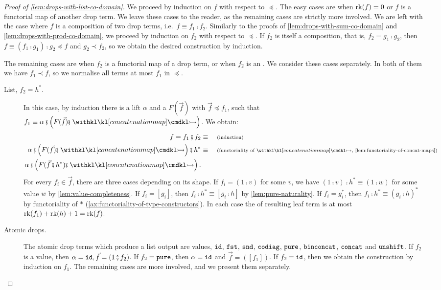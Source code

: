 \begin{proof}[Proof of \cref{lem:drops-with-list-co-domain}]
	We proceed by induction on $f$ with respect to $\preceq$. The easy cases are when $\mathrm{rk}(f) = 0$ or $f$ is a functorial map of another drop term. We leave these cases to the reader, as the remaining cases are strictly more involved. We are left with the case where $f$ is a composition of two drop terms, i.e.~$f \equiv f_1 \comp f_2$. Similarly to the proofs of \cref{lem:drops-with-sum-co-domain} and \cref{lem:drops-with-prod-co-domain}, we proceed by induction on $f_2$ with respect to $\preceq$. If $f_2$ is itself a composition, that is, $f_2 = g_1 \comp g_2$, then $f \equiv (f_1 \comp g_1) \comp g_2 \preceq f$ and $g_2 \prec f_2$, so we obtain the desired construction by induction. 

	The remaining cases are when $f_2$ is a functorial map of a drop term, or when $f_2$ is an . We consider these cases separately. In both of them we have $f_1 \prec f$, so we normalise all terms at most $f_1$ in $\preceq$.
	
	\begin{description}
		\item[List, $f_2 = h^*$.] In this case, by induction there is a lift $\alpha$ and a  $F(\vec f)$ with $\vec f \preceq f_1$, such that $f_1 \equiv \alpha \comp \left( F(\vec f) \comp \concmap \right)$. We obtain:
		\begin{align*}
			f = f_1 \comp f_2 \equalbecause{induction} \\ 
			\alpha \comp \left( F(\vec f) \comp \concmap \right) \comp h^* \equalbecause{functoriality of $\concmap$, \cref{lem:functoriality-of-concat-maps}} \\
			\alpha \comp \left( F(\vec f \comp h^*) \comp \concmap \right).
		\end{align*}
		For every $f_i \in \vec f$, there are three cases depending on its shape. If $f_i = (1\comp{}v)$ for some  $v$, we have $(1\comp{}v)\comp{}h^* \equiv (1\comp{}w)$ for some value $w$ by \cref{lem:value-completeness}. If $f_i = [g_i]$, then $f_i \comp h^* \equiv [g_i \comp h]$ by \cref{lem:pure-naturality}. If $f_i = g_i^*$, then $f_i \comp h^* \equiv (g_i \comp h)^*$ by functoriality of $*$ (\cref{ax:functoriality-of-type-constructors}). In each case the  of resulting leaf term is at most $\mathrm{rk}(f_1) + \mathrm{rk}(h) + 1 = \mathrm{rk}(f)$.

		\item[Atomic drops.] The atomic drop terms which produce a list output are values, $\mathtt{id}$, $\mathtt{fst}$, $\mathtt{snd}$, $\mathtt{codiag}$, $\mathtt{pure}$, $\mathtt{binconcat}$, $\mathtt{concat}$ and $\mathtt{unshift}$. If $f_2$ is a value, then $\alpha = \idterm, \vec f = (1 \comp f_2)$. If $f_2 = \mathtt{pure}$, then $\alpha = \mathtt{id}$ and $\vec f = ([f_1])$. If $f_2 = \mathtt{id}$, then we obtain the construction by induction on $f_1$. The remaining cases are more involved, and we present them separately.


\end{description}
\end{proof}
